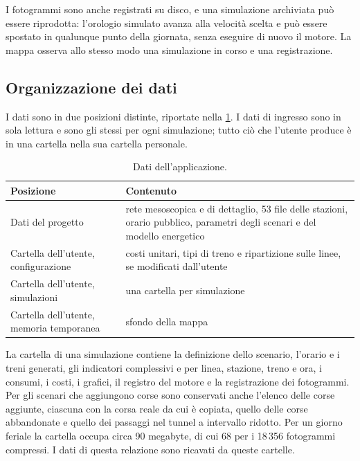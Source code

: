 I fotogrammi sono anche registrati su disco, e una simulazione archiviata può essere riprodotta: l'orologio simulato avanza alla velocità scelta e può essere spostato in qualunque punto della giornata, senza eseguire di nuovo il motore. La mappa osserva allo stesso modo una simulazione in corso e una registrazione.

\subsection{Organizzazione dei dati}
\label{sec:architettura-dati}
I dati sono in due posizioni distinte, riportate nella \cref{tab:architettura-dati}. I dati di ingresso sono in sola lettura e sono gli stessi per ogni simulazione; tutto ciò che l'utente produce è in una cartella nella sua cartella personale.

\begin{table}[H]
	\centering
	\caption{Dati dell'applicazione.}
	\label{tab:architettura-dati}
	\begin{tabularx}{\textwidth}{>{\raggedright\arraybackslash}p{}>{\raggedright\arraybackslash}X}
		\toprule
		Posizione & Contenuto \\
		\midrule
		Dati del progetto & rete mesoscopica e di dettaglio, 53 file delle stazioni, orario pubblico, parametri degli scenari e del modello energetico \\
		Cartella dell'utente, configurazione & costi unitari, tipi di treno e ripartizione sulle linee, se modificati dall'utente \\
		Cartella dell'utente, simulazioni & una cartella per simulazione \\
		Cartella dell'utente, memoria temporanea & sfondo della mappa \\
		\bottomrule
	\end{tabularx}
\end{table}

La cartella di una simulazione contiene la definizione dello scenario, l'orario e i treni generati, gli indicatori complessivi e per linea, stazione, treno e ora, i consumi, i costi, i grafici, il registro del motore e la registrazione dei fotogrammi. Per gli scenari che aggiungono corse sono conservati anche l'elenco delle corse aggiunte, ciascuna con la corsa reale da cui è copiata, quello delle corse abbandonate e quello dei passaggi nel tunnel a intervallo ridotto. Per un giorno feriale la cartella occupa circa 90 megabyte, di cui 68 per i 18\,356 fotogrammi compressi. I dati di questa relazione sono ricavati da queste cartelle.

